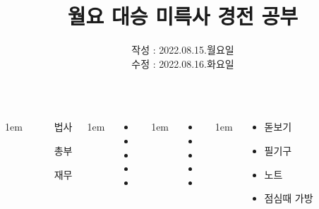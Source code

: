 \documentclass[	20pt, 
							a1paper, 
							portrait, %
							margin=0mm, %
							innermargin=10mm,  		%
							colspace=5mm, 
							subcolspace=0mm
							]{tikzposter}
\title{월요 대승 미륵사 경전 공부}
\author{ 	작성 : 2022.08.15.월요일 \\
			수정 : 2022.08.16.화요일 }
\begin{document}
	\maketitle

	\begin{columns}


			{
					\setlength{\leftmargini}{7em}
					\setlength{\labelsep} {1em}
				\begin{LARGE}
					\begin{itemize}
					\item [법사]
					\item [총부]
					\item [재무]
					\end{itemize}
				\end{LARGE}
			}

			{
					\setlength{\leftmargini}{3em}
					\setlength{\labelsep} {1em}
				\begin{LARGE}
					\begin{itemize}
					\item 
					\item 
					\item 
					\item 
					\item 

					\end{itemize}
				\end{LARGE}
			}

			{
					\setlength{\leftmargini}{3em}
					\setlength{\labelsep} {1em}
				\begin{LARGE}
					\begin{itemize}
					\item 
					\item 
					\item 
					\item 
					\item 

					\end{itemize}
				\end{LARGE}
			}



			{
					\setlength{\leftmargini}{4em}
					\setlength{\labelsep} {1em}
				\begin{LARGE}
					\begin{itemize}
					\item 돋보기
					\item 필기구
					\item 노트
					\item 점심때 가방
					\end{itemize}
				\end{LARGE}
			}




\end{columns}
\end{document}
